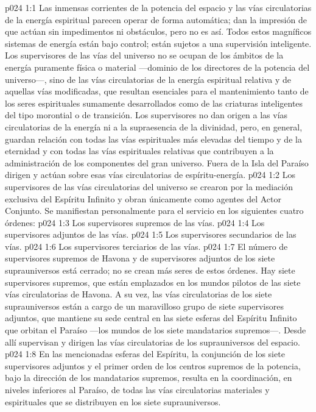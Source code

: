 \vs p024 1:1 Las inmensas corrientes de la potencia del espacio y las vías circulatorias de la energía espiritual parecen operar de forma automática; dan la impresión de que actúan sin impedimentos ni obstáculos, pero no es así. Todos estos magníficos sistemas de energía están bajo control; están sujetos a una supervisión inteligente. Los supervisores de las vías del universo no se ocupan de los ámbitos de la energía puramente física o material ---dominio de los directores de la potencia del universo---, sino de las vías circulatorias de la energía espiritual relativa y de aquellas vías modificadas, que resultan esenciales para el mantenimiento tanto de los seres espirituales sumamente desarrollados como de las criaturas inteligentes del tipo morontial o de transición. Los supervisores no dan origen a las vías circulatorias de la energía ni a la supraesencia de la divinidad, pero, en general, guardan relación con todas las vías espirituales más elevadas del tiempo y de la eternidad y con todas las vías espirituales relativas que contribuyen a la administración de los componentes del gran universo. Fuera de la Isla del Paraíso dirigen y actúan sobre esas vías circulatorias de espíritu\hyp{}energía.
\vs p024 1:2 \pc Los supervisores de las vías circulatorias del universo se crearon por la mediación exclusiva del Espíritu Infinito y obran únicamente como agentes del Actor Conjunto. Se manifiestan personalmente para el servicio en los siguientes cuatro órdenes:
\vs p024 1:3 Los supervisores supremos de las vías.
\vs p024 1:4 Los supervisores adjuntos de las vías.
\vs p024 1:5 Los supervisores secundarios de las vías.
\vs p024 1:6 Los supervisores terciarios de las vías.
\vs p024 1:7 \pc El número de supervisores supremos de Havona y de supervisores adjuntos de los siete suprauniversos está cerrado; no se crean más seres de estos órdenes. Hay siete supervisores supremos, que están emplazados en los mundos pilotos de las siete vías circulatorias de Havona. A su vez, las vías circulatorias de los siete suprauniversos están a cargo de un maravilloso grupo de siete supervisores adjuntos, que mantiene su sede central en las siete esferas del Espíritu Infinito que orbitan el Paraíso ---los mundos de los siete mandatarios supremos---. Desde allí supervisan y dirigen las vías circulatorias de los suprauniversos del espacio.
\vs p024 1:8 En las mencionadas esferas del Espíritu, la conjunción de los siete supervisores adjuntos y el primer orden de los centros supremos de la potencia, bajo la dirección de los mandatarios supremos, resulta en la coordinación, en niveles inferiores al Paraíso, de todas las vías circulatorias materiales y espirituales que se distribuyen en los siete suprauniversos.
